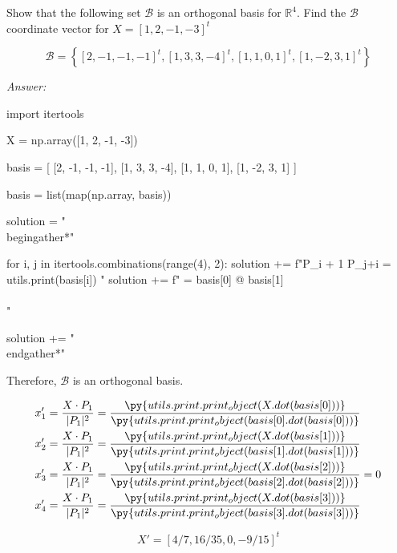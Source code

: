 \documentclass[letterpaper]{article}
\newcommand{\ans}{\textit{Answer: }}
\newenvironment{question}[2][Question]{\begin{trivlist}
\item[\hskip \labelsep {\bfseries #1}\hskip \labelsep {\bfseries #2.}]}{\end{trivlist}}
\newcommand{\printobj}[1]{\py{utils.print.print_object(#1)}}
\begin{document}
\begin{question}{6.9}
  Show that the following set $\mathcal{B}$ is an orthogonal basis for $\mathbb{R}^{4} .$ Find the $\mathcal{B}$
  coordinate vector for $X=[1,2,-1,-3]^{t}$

  $$
  \mathcal{B}=\left\{[2,-1,-1,-1]^{t},[1,3,3,-4]^{t},[1,1,0,1]^{t},[1,-2,3,1]^{t}\right\}
  $$

  \ans 

  \begin{pycode}
import itertools

X = np.array([1, 2, -1, -3])

basis = [
  [2, -1, -1, -1],
  [1, 3, 3, -4],
  [1, 1, 0, 1],
  [1, -2, 3, 1]
]

basis = list(map(np.array, basis))

solution = "\\begin{gather*}\n"

for i, j in itertools.combinations(range(4), 2):
  solution += f"P_{i + 1} \cdot P_{j+i} = {utils.print(basis[i])} "
  solution += f" = {basis[0] @ basis[1]}\\\\\n"

solution += "\\end{gather*}\n"
  \end{pycode}


  Therefore, $\mathcal{B}$ is an orthogonal basis. 

  \begin{align*}
    x_1' &= \dfrac{X\cdot P_1}{|P_1|^2} 
    = \dfrac{\printobj{X.dot(basis[0])}}{\printobj{basis[0].dot(basis[0])}} \\
    x_2' &= \dfrac{X\cdot P_1}{|P_1|^2} 
    = \dfrac{\printobj{X.dot(basis[1])}}{\printobj{basis[1].dot(basis[1])}} \\
    x_3' &= \dfrac{X\cdot P_1}{|P_1|^2} 
    = \dfrac{\printobj{X.dot(basis[2])}}{\printobj{basis[2].dot(basis[2])}} = 0\\
    x_4' &= \dfrac{X\cdot P_1}{|P_1|^2} 
    = \dfrac{\printobj{X.dot(basis[3])}}{\printobj{basis[3].dot(basis[3])}} 
  \end{align*}

  $$X' = \left[4/7, 16/35, 0, -9/15\right]^t$$
\end{question}
\end{document}
